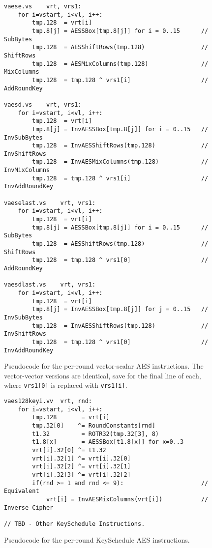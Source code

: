 \begin{figure}[h]
\begin{lstlisting}[language=pseudo]
vaese.vs    vrt, vrs1:
    for i=vstart, i<vl, i++:
        tmp.128  = vrt[i]
        tmp.8[j] = AESSBox[tmp.8[j]] for i = 0..15      // SubBytes
        tmp.128  = AESShiftRows(tmp.128)                // ShiftRows
        tmp.128  = AESMixColumns(tmp.128)               // MixColumns
        tmp.128  = tmp.128 ^ vrs1[i]                    // AddRoundKey

vaesd.vs    vrt, vrs1:
    for i=vstart, i<vl, i++:
        tmp.128  = vrt[i]
        tmp.8[j] = InvAESSBox[tmp.8[j]] for i = 0..15   // InvSubBytes
        tmp.128  = InvAESShiftRows(tmp.128)             // InvShiftRows
        tmp.128  = InvAESMixColumns(tmp.128)            // InvMixColumns
        tmp.128  = tmp.128 ^ vrs1[i]                    // InvAddRoundKey

vaeselast.vs    vrt, vrs1:
    for i=vstart, i<vl, i++:
        tmp.128  = vrt[i]
        tmp.8[j] = AESSBox[tmp.8[j]] for i = 0..15      // SubBytes
        tmp.128  = AESShiftRows(tmp.128)                // ShiftRows
        tmp.128  = tmp.128 ^ vrs1[0]                    // AddRoundKey

vaesdlast.vs    vrt, vrs1:
    for i=vstart, i<vl, i++:
        tmp.128  = vrt[i]
        tmp.8[j] = InvAESSBox[tmp.8[j]] for j = 0..15   // InvSubBytes
        tmp.128  = InvAESShiftRows(tmp.128)             // InvShiftRows
        tmp.128  = tmp.128 ^ vrs1[0]                    // InvAddRoundKey
\end{lstlisting}
\caption{Pseudocode for the per-round vector-scalar AES instructions.
The vector-vector versions are identical, save for the final
line of each, where {\tt vrs1[0]} is replaced with {\tt vrs1[i]}.}
\label{fig:pseudo:aes:vector:per-round}
\end{figure}

\begin{figure}[h]
\begin{lstlisting}[language=pseudo]
vaes128keyi.vv  vrt, rnd:
    for i=vstart, i<vl, i++:
        tmp.128       = vrt[i]
        tmp.32[0]    ^= RoundConstants[rnd]
        t1.32         = ROTR32(tmp.32[3], 8)
        t1.8[x]       = AESSBox[t1.8[x]] for x=0..3
        vrt[i].32[0] ^= t1.32
        vrt[i].32[1] ^= vrt[i].32[0]
        vrt[i].32[2] ^= vrt[i].32[1]
        vrt[i].32[3] ^= vrt[i].32[2]
        if(rnd >= 1 and rnd <= 9):                      // Equivalent
            vrt[i] = InvAESMixColumns(vrt[i])           // Inverse Cipher
	
// TBD - Other KeySchedule Instructions.
\end{lstlisting}
\caption{Pseudocode for the per-round KeySchedule AES instructions.}
\label{fig:pseudo:aes:vector:per-round:ks}
\end{figure}


